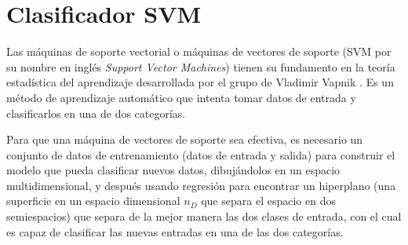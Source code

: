 



\section{Clasificador SVM}
Las máquinas de soporte vectorial o máquinas de vectores de soporte (SVM por su nombre en inglés \textit{Support Vector Machines}) tienen su fundamento en la teoría estadística del aprendizaje desarrollada por el grupo de Vladimir Vapnik \cite{cortes1995support,boser1992training}. Es un método de aprendizaje automático que intenta tomar datos de entrada y clasificarlos en una de dos categorías.
 
Para que una máquina de vectores de soporte sea efectiva, es necesario un conjunto de datos de entrenamiento (datos de entrada y salida)  para construir el modelo que pueda clasificar nuevos datos, dibujándolos en un espacio multidimensional, y después usando regresión para encontrar un hiperplano (una superficie en un espacio dimensional $n_{D}$ que separa el espacio en dos semiespacios) que separa de la mejor manera las dos clases de entrada, con el cual es capaz de clasificar las nuevas entradas en una de las dos categorías.



